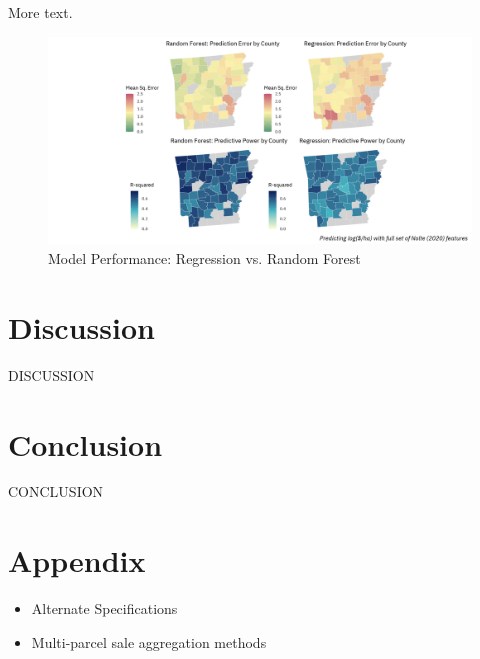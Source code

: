 \documentclass[12pt]{article}
\begin{document}
More text.

\begin{figure}
    \centering
    \includegraphics[width=6in]{eda_images/rf_reg_compare.png}
    \caption{Model Performance: Regression vs. Random Forest}
    \label{fig:model_compare}
\end{figure}

\newpage

\section{Discussion}

DISCUSSION

\newpage

\section{Conclusion}

CONCLUSION

\newpage

\section{Appendix}

\begin{itemize}
    \item Alternate Specifications
    \item Multi-parcel sale aggregation methods
\end{itemize}


\newpage


\printbibliography
\end{document}
